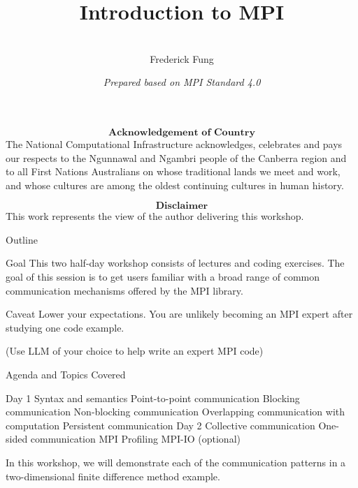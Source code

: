 \documentclass[xcolor=dvipsnames]{beamer}
\title[NCI Training \cc]{Introduction to MPI}%
\author[Fred Fung]{ \\ Frederick Fung}%
\institute[NCI] %
{
  National Computational Infrastructure, Australia
}
\date[2022] %
{ \textit{Prepared based on MPI Standard 4.0}}
\begin{document}
\begin{frame}
  \titlepage
\end{frame}

\begin{frame}
$$\textbf{Acknowledgement of Country}$$
The National Computational Infrastructure acknowledges, celebrates and pays our respects to the Ngunnawal and Ngambri people of the Canberra region and to all First Nations Australians on whose traditional lands we meet and work, and whose cultures are among the oldest continuing cultures in human history.
\end{frame}

\begin{frame}
$$\textbf{Disclaimer}$$
This work represents the view of the author delivering this workshop. 
\end{frame}


\begin{frame}{Outline}
\begin{block}{Goal}
This two half-day workshop consists of lectures and coding exercises. The goal of this session is to get users familiar with a broad range of common communication mechanisms offered by the MPI library.
\end{block}

\pause
\begin{block}{Caveat}
Lower your expectations. You are unlikely becoming an MPI expert after studying one code example. 

(Use LLM of your choice to help write an expert MPI code)
\end{block}
\end{frame}

\begin{frame}{Agenda and Topics Covered}
\begin{outline}
    \1 Day 1
     \2 Syntax and semantics
    \2 Point-to-point communication
    \3 Blocking communication
    \3 Non-blocking communication
    \3 Overlapping communication with computation
    \3 Persistent communication 
    \1 Day 2
     \2Collective communication
    \2 One-sided communication
    \2 MPI Profiling
    \2 MPI-IO (optional)
\end{outline}
\pause
\begin{block}{}
In this workshop, we will demonstrate each of the communication patterns in a two-dimensional finite difference method example.    
\end{block}
\end{frame}
\end{document}

